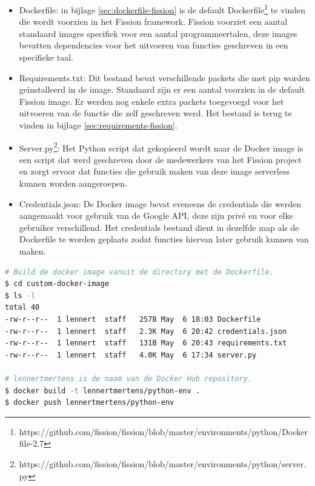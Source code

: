 \begin{itemize}
    \item Dockerfile: in bijlage \ref{sec:dockerfile-fission} is de default Dockerfile\footnote{https://github.com/fission/fission/blob/master/environments/python/Dockerfile-2.7} te vinden die wordt voorzien in het Fission framework. Fission voorziet een aantal standaard images specifiek voor een aantal programmeertalen, deze images bevatten dependencies voor het uitvoeren van functies geschreven in een specifieke taal.
    \item Requirements.txt: Dit bestand bevat verschillende packets die met pip worden geïnstalleerd in de image. Standaard zijn er een aantal voorzien in de default Fission image. Er werden nog enkele extra packets toegevoegd voor het uitvoeren van de functie die zelf geschreven werd. Het bestand is terug te vinden in bijlage \ref{sec:requirements-fission}.
    \item Server.py\footnote{https://github.com/fission/fission/blob/master/environments/python/server.py}: Het Python script dat gekopieerd wordt naar de Docker image is een script dat werd geschreven door de medewerkers van het Fission project en zorgt ervoor dat functies die gebruik maken van deze image serverless kunnen worden aangeroepen. 
    \item Credentials.json: De Docker image bevat eveneens de credentials die werden aangemaakt voor gebruik van de Google API, deze zijn privé en voor elke gebruiker verschillend. Het credentials bestand dient in dezelfde map als de Dockerfile te worden geplaats zodat functies hiervan later gebruik kunnen van maken. 
\end{itemize}

\begin{lstlisting}[language=bash]
# Build de docker image vanuit de directory met de Dockerfile.
$ cd custom-docker-image
$ ls -l
total 40
-rw-r--r--  1 lennert  staff   257B May  6 18:03 Dockerfile
-rw-r--r--  1 lennert  staff   2.3K May  6 20:42 credentials.json
-rw-r--r--  1 lennert  staff   131B May  6 20:43 requirements.txt
-rw-r--r--  1 lennert  staff   4.0K May  6 17:34 server.py

# lennertmertens is de naam van de Docker Hub repository.
$ docker build -t lennertmertens/python-env . 
$ docker push lennertmertens/python-env
\end{lstlisting}

